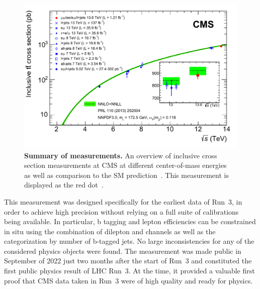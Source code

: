\begin{figure}[!ht]
    \centering
    \includegraphics[width=0.8\linewidth]{figures/ttxs/tt_curve.pdf}
    \caption{\textbf{Summary of \sigmatt measurements.} An overview of inclusive \ttbar cross section measurements at CMS at different center-of-mass energies~\cite{CMS:TOP-11-007, CMS:TOP-14-018, CMS:TOP-12-006, CMS:TOP-13-004, CMS:TOP-17-001, CMS:TOP-18-005, CMS:TOP-20-001, CMS:TOP-20-004} as well as comparison to the SM prediction~\cite{Czakon:2013goa}. This measurement is displayed as the red dot~\cite{CMS:TOP-22-012}.}
    \label{fig:ttxs:ttcurve}
\end{figure}

This measurement was designed specifically for the earliest data of Run~3, in order to achieve high precision without relying on a full suite of calibrations being available. In particular, b tagging and lepton efficiencies can be constrained in situ using the combination of dilepton and \ljets channels as well as the categorization by number of b-tagged jets. No large inconsistencies for any of the considered physics objects were found. The measurement was made public in September of 2022 just two months after the start of Run~3 and constituted the first public physics result of LHC Run~3. At the time, it provided a valuable first proof that CMS data taken in Run~3 were of high quality and ready for physics.

